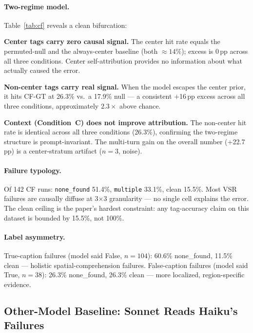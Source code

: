 \documentclass[twoside,11pt]{article}
\begin{document}
\paragraph{Two-regime model.}
Table~\ref{tab:cf} reveals a clean bifurcation:

\textbf{Center tags carry zero causal signal.}
The center hit rate equals the permuted-null and the always-center baseline
(both ${\approx}14\%$); excess is 0\,pp across all three conditions.
Center self-attribution provides no information about what actually caused the error.

\textbf{Non-center tags carry real signal.}
When the model escapes the center prior, it hits CF-GT at 26.3\% vs.\ a
17.9\% null — a consistent $+$16\,pp excess across all three conditions,
approximately $2.3\times$ above chance.

\textbf{Context (Condition~C) does not improve attribution.}
The non-center hit rate is identical across all three conditions (26.3\%),
confirming the two-regime structure is prompt-invariant.
The multi-turn gain on the overall number ($+$22.7\,pp) is a center-stratum
artifact ($n{=}3$, noise).

\paragraph{Failure typology.}
Of 142 CF runs: \texttt{none\_found} 51.4\%, \texttt{multiple} 33.1\%,
clean 15.5\%.
Most VSR failures are causally diffuse at 3$\times$3 granularity — no single
cell explains the error.
The clean ceiling is the paper's hardest constraint: any tag-accuracy claim on
this dataset is bounded by 15.5\%, not 100\%.

\paragraph{Label asymmetry.}
True-caption failures (model said False, $n{=}104$): 60.6\% none\_found,
11.5\% clean — holistic spatial-comprehension failures.
False-caption failures (model said True, $n{=}38$): 26.3\% none\_found,
26.3\% clean — more localized, region-specific evidence.

\subsection{Other-Model Baseline: Sonnet Reads Haiku's Failures}
\label{sec:sonnet}
\end{document}
